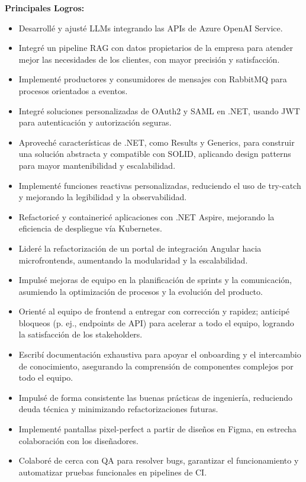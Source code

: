 \documentclass[10pt,a4paper]{altacv}
\begin{document}
\textbf{Principales Logros:}
\begin{itemize}
\setlength{\itemindent}{0.5em}
\item[--] Desarrollé y ajusté LLMs integrando las APIs de Azure OpenAI Service.
\item[--] Integré un pipeline RAG con datos propietarios de la empresa para atender mejor las necesidades de los clientes, con mayor precisión y satisfacción.
\item[--] Implementé productores y consumidores de mensajes con RabbitMQ para procesos orientados a eventos.
\item[--] Integré soluciones personalizadas de OAuth2 y SAML en .NET, usando JWT para autenticación y autorización seguras.
\item[--] Aproveché características de .NET, como Results y Generics, para construir una solución abstracta y compatible con SOLID, aplicando design patterns para mayor mantenibilidad y escalabilidad.
\item[--] Implementé funciones reactivas personalizadas, reduciendo el uso de try-catch y mejorando la legibilidad y la observabilidad.
\item[--] Refactoricé y containericé aplicaciones con .NET Aspire, mejorando la eficiencia de despliegue vía Kubernetes.
\item[--] Lideré la refactorización de un portal de integración Angular hacia microfrontends, aumentando la modularidad y la escalabilidad.
\item[--] Impulsé mejoras de equipo en la planificación de sprints y la comunicación, asumiendo la optimización de procesos y la evolución del producto.
\item[--] Orienté al equipo de frontend a entregar con corrección y rapidez; anticipé bloqueos (p. ej., endpoints de API) para acelerar a todo el equipo, logrando la satisfacción de los stakeholders.
\item[--] Escribí documentación exhaustiva para apoyar el onboarding y el intercambio de conocimiento, asegurando la comprensión de componentes complejos por todo el equipo.
\item[--] Impulsé de forma consistente las buenas prácticas de ingeniería, reduciendo deuda técnica y minimizando refactorizaciones futuras.
\item[--] Implementé pantallas pixel-perfect a partir de diseños en Figma, en estrecha colaboración con los diseñadores.
\item[--] Colaboré de cerca con QA para resolver bugs, garantizar el funcionamiento y automatizar pruebas funcionales en pipelines de CI.
\end{itemize}
\end{document}

